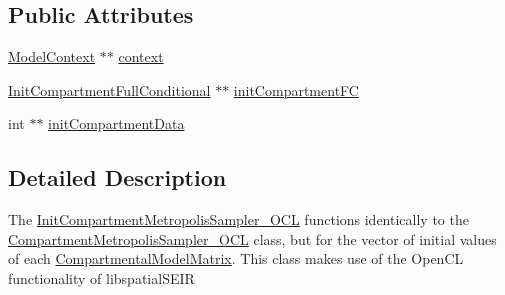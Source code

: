 \subsection*{Public Attributes}
\begin{DoxyCompactItemize}
\item 
\hyperlink{classSpatialSEIR_1_1ModelContext}{Model\-Context} $\ast$$\ast$ \hyperlink{classSpatialSEIR_1_1InitCompartmentMetropolisSampler__OCL_af79702dd1769bd3b988afdd33d975830}{context}
\item 
\hyperlink{classSpatialSEIR_1_1InitCompartmentFullConditional}{Init\-Compartment\-Full\-Conditional} $\ast$$\ast$ \hyperlink{classSpatialSEIR_1_1InitCompartmentMetropolisSampler__OCL_a1081812ec3f70109ed016877c7f44db2}{init\-Compartment\-F\-C}
\item 
int $\ast$$\ast$ \hyperlink{classSpatialSEIR_1_1InitCompartmentMetropolisSampler__OCL_a1f3d1244aa54a5d0530e8d31e36108c8}{init\-Compartment\-Data}
\end{DoxyCompactItemize}


\subsection{Detailed Description}
The \hyperlink{classSpatialSEIR_1_1InitCompartmentMetropolisSampler__OCL}{Init\-Compartment\-Metropolis\-Sampler\-\_\-\-O\-C\-L} functions identically to the \hyperlink{classSpatialSEIR_1_1CompartmentMetropolisSampler__OCL}{Compartment\-Metropolis\-Sampler\-\_\-\-O\-C\-L} class, but for the vector of initial values of each \hyperlink{classSpatialSEIR_1_1CompartmentalModelMatrix}{Compartmental\-Model\-Matrix}. This class makes use of the Open\-C\-L functionality of libspatial\-S\-E\-I\-R 

